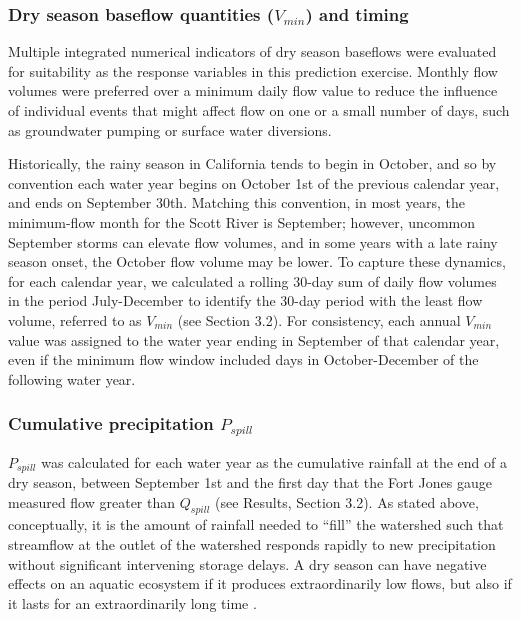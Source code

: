 \documentclass[hess, manuscript]{copernicus}
\begin{document}
\subsubsection{\texorpdfstring{Dry season baseflow quantities
(\(V_{min}\)) and
timing}{Dry season baseflow quantities (V\_\{min\}) and timing}}

Multiple integrated numerical indicators of dry season baseflows were
evaluated for suitability as the response variables in this prediction
exercise. Monthly flow volumes were preferred over a minimum daily flow
value to reduce the influence of individual events that might affect
flow on one or a small number of days, such as groundwater pumping or
surface water diversions.

Historically, the rainy season in California tends to begin in October,
and so by convention each water year begins on October 1st of the
previous calendar year, and ends on September 30th. Matching this
convention, in most years, the minimum-flow month for the Scott River is
September; however, uncommon September storms can elevate flow volumes,
and in some years with a late rainy season onset, the October flow
volume may be lower. To capture these dynamics, for each calendar year,
we calculated a rolling 30-day sum of daily flow volumes in the period
July-December to identify the 30-day period with the least flow volume,
referred to as \(V_{min}\) (see Section 3.2). For consistency, each
annual \(V_{min}\) value was assigned to the water year ending in
September of that calendar year, even if the minimum flow window
included days in October-December of the following water year.

\subsubsection{\texorpdfstring{Cumulative precipitation
\(P_{spill}\)}{Cumulative precipitation P\_\{spill\}}}

\(P_{spill}\) was calculated for each water year as the cumulative
rainfall at the end of a dry season, between September 1st and the first
day that the Fort Jones gauge measured flow greater than \(Q_{spill}\)
(see Results, Section 3.2). As stated above, conceptually, it is the
amount of rainfall needed to ``fill'' the watershed such that streamflow
at the outlet of the watershed responds rapidly to new precipitation
without significant intervening storage delays. A dry season can have
negative effects on an aquatic ecosystem if it produces extraordinarily
low flows, but also if it lasts for an extraordinarily long time
\citeyearpar[e.g., delayed salmon habitat access, CDFW][]{CDFW2015a}.
\end{document}
